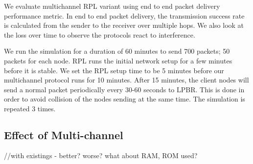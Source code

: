 


We evaluate multichannel RPL variant using end to end packet delivery performance metric. In end to end packet delivery, the transmission success rate is calculated from the sender to the receiver over multiple hops. We also look at the loss over time to observe the protocols react to interference.

We run the simulation for a duration of 60 minutes to send 700 packets; 50 packets for each node. RPL runs the initial network setup for a few minutes before it is stable. We set the RPL setup time to be 5 minutes before our multichannel protocol runs for 10 minutes. After 15 minutes, the client nodes will send a normal packet periodically every 30-60 seconds to LPBR. This is done in order to avoid collision of the nodes sending at the same time. The simulation is repeated 3 times.




\subsection{Effect of Multi-channel}
//with existings - better? worse? what about RAM, ROM used?

